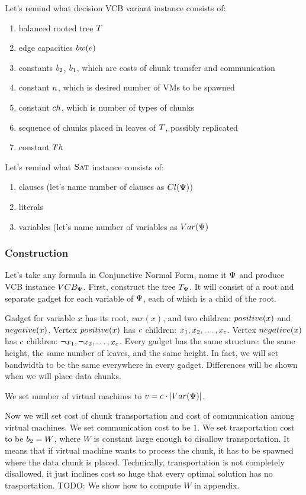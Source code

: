 Let's remind what decision VCB variant instance consists of:
\begin{enumerate}
\item balanced rooted tree $T$ 
\item edge capacities $bw(e)$
\item constants $b_2$, $b_1$, which are costs of chunk transfer and
communication
\item constant $n$, which is desired number of VMs to be spawned
\item constant $ch$, which is number of types of chunks
\item sequence of chunks placed in leaves of $T$, possibly replicated
\item constant $Th$
\end{enumerate}

Let's remind what $\textsc{Sat}$ instance consists of:
\begin{enumerate}
\item clauses (let's name number of clauses as $Cl(\Psi)$)
\item literals
\item variables (let's name number of variables as $Var(\Psi)$
\end{enumerate}

\subsubsection{Construction}
Let's take any formula in Conjunctive Normal Form, name it $\Psi$ and produce
VCB instance $VCB_{\Psi}$. First, construct the tree $T_{\Psi}$. It will consist of
a root and separate gadget for each variable of $\Psi$, each of which
is a child of the root.


Gadget for variable $x$ has its root, $var(x)$, and two children:
$positive(x)$ and $negative(x)$. Vertex $positive(x)$ has $c$
children: $x_1, x_2, \ldots, x_{c}$. Vertex $negative(x)$ has
$c$ children: $\neg x_1, \neg x_2, \dots, x_{c}$. Every
gadget has the same structure: the same height, the same number of
leaves, and the same height. In fact, we will set bandwidth to be the
same everywhere in every gadget. Differences will be shown when we
will place data chunks.

We set number of virtual machines to $v = c \cdot |Var(\Psi)|$.

Now we will set cost of chunk transportation and cost of communication
among virtual machines. We set communication cost to be $1$. We set
trasportation cost to be $b_2 = W$, where $W$ is constant large enough
to disallow transportation. It means that if virtual machine wants to
process the chunk, it has to be spawned where the data chunk is
placed. Technically, transportation is not completely disallowed, it
just inclines cost so huge that every optimal solution has no
trasportation. TODO: We show how to compute $W$ in appendix.

